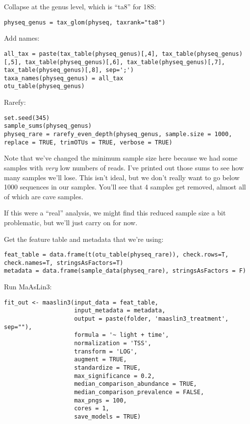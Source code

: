 \documentclass[
]{book}
\begin{document}
Collapse at the genus level, which is ``ta8'' for 18S:

\begin{verbatim}
physeq_genus = tax_glom(physeq, taxrank="ta8")
\end{verbatim}

Add names:

\begin{verbatim}
all_tax = paste(tax_table(physeq_genus)[,4], tax_table(physeq_genus)[,5], tax_table(physeq_genus)[,6], tax_table(physeq_genus)[,7], tax_table(physeq_genus)[,8], sep=';')
taxa_names(physeq_genus) = all_tax
otu_table(physeq_genus)
\end{verbatim}

Rarefy:

\begin{verbatim}
set.seed(345)
sample_sums(physeq_genus)
physeq_rare = rarefy_even_depth(physeq_genus, sample.size = 1000, replace = TRUE, trimOTUs = TRUE, verbose = TRUE)
\end{verbatim}

Note that we've changed the minimum sample size here because we had some samples with \emph{very} low numbers of reads. I've printed out those sums to see how many samples we'll lose. This isn't ideal, but we don't really want to go below 1000 sequences in our samples. You'll see that 4 samples get removed, almost all of which are cave samples.

If this were a ``real'' analysis, we might find this reduced sample size a bit problematic, but we'll just carry on for now.

Get the feature table and metadata that we're using:

\begin{verbatim}
feat_table = data.frame(t(otu_table(physeq_rare)), check.rows=T, check.names=T, stringsAsFactors=T)
metadata = data.frame(sample_data(physeq_rare), stringsAsFactors = F)
\end{verbatim}

Run MaAsLin3:

\begin{verbatim}
fit_out <- maaslin3(input_data = feat_table,
                    input_metadata = metadata,
                    output = paste(folder, 'maaslin3_treatment', sep=""),
                    formula = '~ light + time',
                    normalization = 'TSS',
                    transform = 'LOG',
                    augment = TRUE,
                    standardize = TRUE,
                    max_significance = 0.2,
                    median_comparison_abundance = TRUE,
                    median_comparison_prevalence = FALSE,
                    max_pngs = 100,
                    cores = 1,
                    save_models = TRUE)
\end{verbatim}
\end{document}
